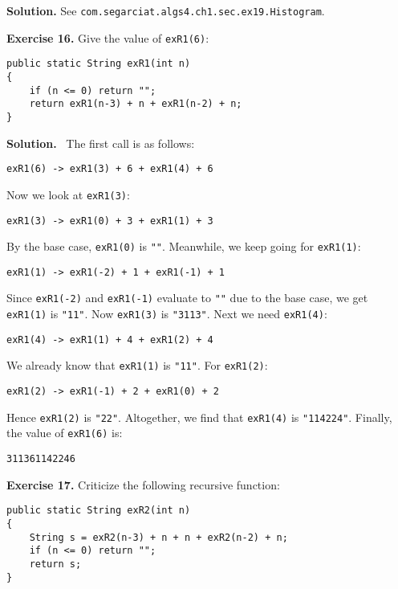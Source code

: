\documentclass[12pt, a4paper]{article}
\newenvironment{ex}[2][Exercise]
{\par\medskip\noindent \textbf{#1 #2.}}
{\medskip}
\newenvironment{sol}[1][Solution]
{\par\medskip\noindent \textbf{#1.} }
{\medskip}
\begin{document}
	\begin{sol}
		See \texttt{com.segarciat.algs4.ch1.sec.ex19.Histogram}.
	\end{sol}
	\begin{ex}{16}
		Give the value of \texttt{exR1(6)}:
		\begin{lstlisting}
public static String exR1(int n)
{
	if (n <= 0) return "";
	return exR1(n-3) + n + exR1(n-2) + n;
}
		\end{lstlisting}
	\end{ex}
	\begin{sol}
		\
			The first call is as follows:
		\begin{lstlisting}[language={}]
exR1(6) -> exR1(3) + 6 + exR1(4) + 6
		\end{lstlisting}
		Now we look at \texttt{exR1(3)}:
		\begin{lstlisting}[language={}]
exR1(3) -> exR1(0) + 3 + exR1(1) + 3
		\end{lstlisting}
		By the base case, \texttt{exR1(0)} is \texttt{""}. Meanwhile, we keep going for \texttt{exR1(1)}:
		\begin{lstlisting}[language={}]
exR1(1) -> exR1(-2) + 1 + exR1(-1) + 1
		\end{lstlisting}
		Since \texttt{exR1(-2)} and \texttt{exR1(-1)} evaluate to \texttt{""} due to the
		base case, we get \texttt{exR1(1)} is \texttt{"11"}. Now \texttt{exR1(3)} is \texttt{"3113"}.
		Next we need \texttt{exR1(4)}:
		\begin{lstlisting}[language={}]
exR1(4) -> exR1(1) + 4 + exR1(2) + 4
		\end{lstlisting}
		We already know that \texttt{exR1(1)} is \texttt{"11"}. For \texttt{exR1(2)}:
		\begin{lstlisting}[language={}]
exR1(2) -> exR1(-1) + 2 + exR1(0) + 2
		\end{lstlisting}
		Hence \texttt{exR1(2)} is \texttt{"22"}. Altogether, we find that \texttt{exR1(4)} is
		\texttt{"114224"}. Finally, the value of \texttt{exR1(6)} is:
		\begin{lstlisting}[language={}]
311361142246
		\end{lstlisting}
	\end{sol}
	\begin{ex}{17}
		Criticize the following recursive function:
		\begin{lstlisting}
public static String exR2(int n)
{
	String s = exR2(n-3) + n + n + exR2(n-2) + n;
	if (n <= 0) return "";
	return s;
}
		\end{lstlisting}
	\end{ex}
\end{document}
